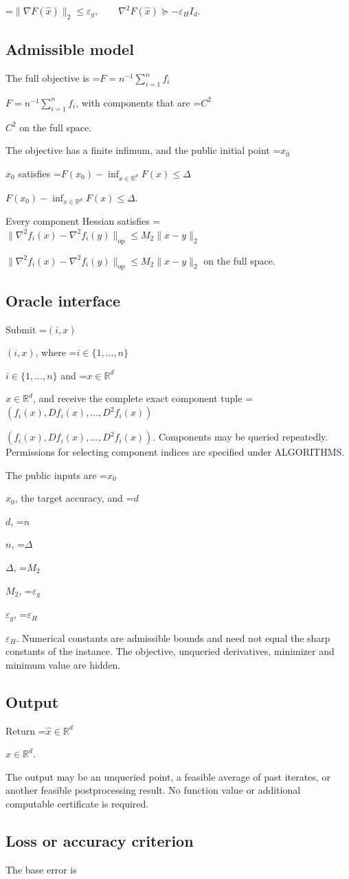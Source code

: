 \documentclass[10pt,a4paper]{article}
\newcommand{\AtlasMath}[1]{\par\begingroup\centering\setbox0=\hbox{$\displaystyle #1$}\ifdim\wd0>1.4\linewidth\typeout{ATLAS WIDE FORMULA: \the\wd0}\fi\ifdim\wd0>\linewidth\resizebox{\linewidth}{!}{\box0}\else\box0\fi\par\endgroup}
\newcommand{\AtlasInlineMath}[1]{\begingroup\setbox0=\hbox{$#1$}\ifdim\wd0>.4\linewidth\endgroup\AtlasMath{#1}\else\endgroup$#1$\fi}
\begin{document}
\AtlasMath{\|\nabla F(\widehat{x})\|_2\le\varepsilon_g,\qquad\nabla^2F(\widehat{x})\succeq-\varepsilon_H I_d.}


\subsection{Admissible model}
The full objective is \AtlasInlineMath{F=n^{-1}\sum_{i=1}^n f_i}, with components that are \AtlasInlineMath{C^2} on the full space.

The objective has a finite infimum, and the public initial point \AtlasInlineMath{x_0} satisfies \AtlasInlineMath{F(x_0)-\inf_{x\in \mathbb{R}^d}F(x)\le\Delta}.

Every component Hessian satisfies \AtlasInlineMath{\|\nabla^2f_i(x)-\nabla^2f_i(y)\|_{\mathrm{op}}\le M_2\|x-y\|_2} on the full space.

\subsection{Oracle interface}
Submit \AtlasInlineMath{(i,x)}, where \AtlasInlineMath{i\in\{1,\ldots,n\}} and \AtlasInlineMath{x\in\mathbb{R}^d}, and receive the complete exact component tuple \AtlasInlineMath{(f_i(x),Df_i(x),\ldots,D^{2}f_i(x))}. Components may be queried repeatedly. Permissions for selecting component indices are specified under ALGORITHMS.

The public inputs are \AtlasInlineMath{x_0}, the target accuracy, and \AtlasInlineMath{d}, \AtlasInlineMath{n}, \AtlasInlineMath{\Delta}, \AtlasInlineMath{M_2}, \AtlasInlineMath{\varepsilon_g}, \AtlasInlineMath{\varepsilon_H}. Numerical constants are admissible bounds and need not equal the sharp constants of the instance. The objective, unqueried derivatives, minimizer and minimum value are hidden.

\subsection{Output}
Return \AtlasInlineMath{\widehat{x}\in \mathbb{R}^d}.

The output may be an unqueried point, a feasible average of past iterates, or another feasible postprocessing result. No function value or additional computable certificate is required.

\subsection{Loss or accuracy criterion}
The base error is
\end{document}
